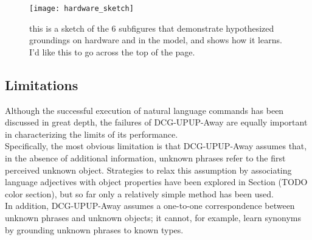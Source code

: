 \begin{figure}[ht]
\centering
\texttt{[image: hardware\_sketch]}
\caption{this is a sketch of the 6 subfigures that demonstrate hypothesized groundings on hardware and in the model, and shows how it learns. I'd like this to go across the top of the page.}
\label{fig:hardware_demo}
\end{figure}

\subsection{Limitations}
Although the successful execution of natural language commands has been discussed in great depth, the failures of DCG-UPUP-Away are equally important in characterizing the limits of its performance.\\
\indent Specifically, the most obvious limitation is that DCG-UPUP-Away assumes that, in the absence of additional information, unknown phrases refer to the first perceived unknown object.
Strategies to relax this assumption by associating language adjectives with object properties have been explored in Section (TODO color section), but so far only a relatively simple method has been used.\\
\indent In addition, DCG-UPUP-Away assumes a one-to-one correspondence between unknown phrases and unknown objects; it cannot, for example, learn synonyms by grounding unknown phrases to known types.